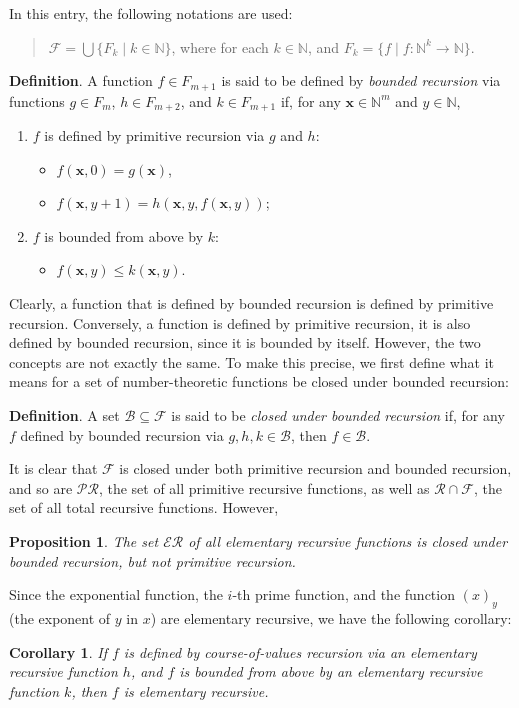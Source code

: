 \documentclass[12pt]{article}
\newtheorem{prop}{Proposition}
\newtheorem{cor}{Corollary}
\begin{document}
In this entry, the following notations are used:
\begin{quote} $\mathcal{F} = \bigcup \lbrace F_k \mid k \in \mathbb{N}
\rbrace$, where for each $k \in \mathbb{N}$, and $F_k = \lbrace f \mid f \colon \mathbb{N}^{k}
\to \mathbb{N} \rbrace$. \end{quote}

\textbf{Definition}.  A function $f\in F_{m+1}$ is said to be defined by \emph{bounded recursion} via functions $g\in F_m$, $h\in F_{m+2}$, and $k\in F_{m+1}$ if, for any $\boldsymbol{x}\in \mathbb{N}^m$ and $y\in \mathbb{N}$,
\begin{enumerate}
\item $f$ is defined by primitive recursion via $g$ and $h$:
\begin{itemize}
\item $f(\boldsymbol{x},0)=g(\boldsymbol{x})$,
\item $f(\boldsymbol{x},y+1)=h(\boldsymbol{x},y,f(\boldsymbol{x},y))$;
\end{itemize}
\item $f$ is bounded from above by $k$: 
\begin{itemize}
\item $f(\boldsymbol{x},y)\le k(\boldsymbol{x},y)$.
\end{itemize}
\end{enumerate}

Clearly, a function that is defined by bounded recursion is defined by primitive recursion.  Conversely, a function is defined by primitive recursion, it is also defined by bounded recursion, since it is bounded by itself.  However, the two concepts are not exactly the same.  To make this precise, we first define what it means for a set of number-theoretic functions be closed under bounded recursion:

\textbf{Definition}.  A set $\mathcal{B}\subseteq \mathcal{F}$ is said to be \emph{closed under bounded recursion} if, for any $f$ defined by bounded recursion via $g,h,k\in \mathcal{B}$, then $f\in \mathcal{B}$.

It is clear that $\mathcal{F}$ is closed under both primitive recursion and bounded recursion, and so are $\mathcal{PR}$, the set of all primitive recursive functions, as well as $\mathcal{R}\cap \mathcal{F}$, the set of all total recursive functions.  However,

\begin{prop} The set $\mathcal{ER}$ of all elementary recursive functions is closed under bounded recursion, but not primitive recursion.  \end{prop}

Since the exponential function, the $i$-th prime function, and the function $(x)_y$ (the exponent of $y$ in $x$) are elementary recursive, we have the following corollary:

\begin{cor} If $f$ is defined by course-of-values recursion via an elementary recursive function $h$, and $f$ is bounded from above by an elementary recursive function $k$, then $f$ is elementary recursive. \end{cor}
\end{document}
